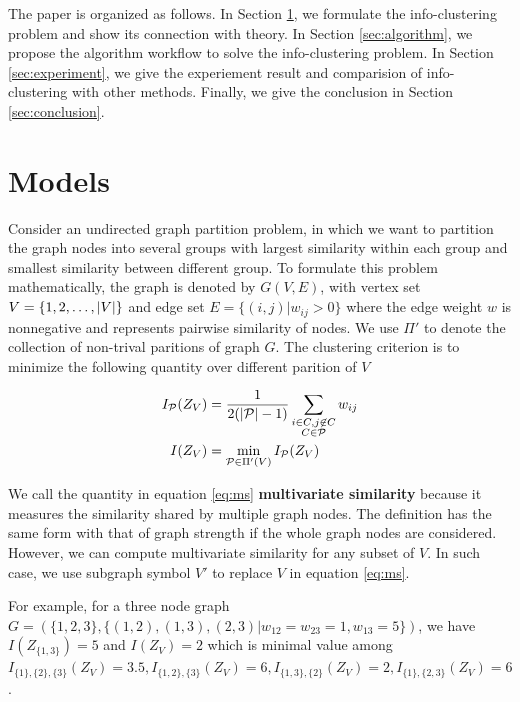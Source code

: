\documentclass{article}
\begin{document}
The paper is organized as follows. In Section \ref{sec:models}, we formulate the info-clustering problem and show its connection with theory. In Section \ref{sec:algorithm}, we propose the algorithm workflow to solve the info-clustering problem. In Section \ref{sec:experiment}, we give the experiement result and comparision of info-clustering with other methods. Finally, we give the conclusion in Section \ref{sec:conclusion}.


\section{Models}\label{sec:models}

Consider an undirected graph partition problem, in which we want to partition the graph nodes into several groups with largest similarity within each group and smallest similarity between different group. To formulate this problem mathematically, the graph is denoted by $G(V,E)$, with vertex set $V = \{1, 2, \dots, \lvert V\rvert\}$ and edge set $E=\{(i,j) | w_{ij}>0\}$ where the edge weight $w$ is nonnegative and represents pairwise similarity of nodes. We use $\Pi'$ to denote the collection of non-trival paritions of graph $G$. The clustering criterion is to minimize the following quantity over different parition of $V$
\begin{definition}\label{def:ms}
\begin{align}
I_{\mathcal{P}}(Z_V) & = {1 \over 2 ( \lvert\mathcal{P}\rvert - 1) } \sum_{\substack{i\in C, j \not\in C\\ C\in \mathcal{P}}} w_{ij} \\
I(Z_V) & = \min_{\mathcal{P} \in \Pi'(V)} I_{\mathcal{P}}(Z_V)  \label{eq:ms}
\end{align}
\end{definition}

We call the quantity in equation \eqref{eq:ms} \textbf{multivariate similarity} because it measures the similarity shared by multiple graph nodes. The definition has the same form with that of graph strength if  the whole graph nodes are considered\cite{RN12}. However, we can compute multivariate similarity for any subset of $V$. In such case, 
we use subgraph symbol $V'$ to replace $V$ in equation \eqref{eq:ms}.

For example, for a three node graph $G=(\{1,2,3\},\{(1,2),(1,3),(2,3)| w_{12}=w_{23}=1, w_{13}=5\})$, we have $I(Z_{\{1,3\}}) = 5$ and $I(Z_V) = 2$ which is minimal value among $I_{\{1\},\{2\},\{3\}}(Z_V)=3.5, I_{\{1, 2\},\{3\}}(Z_V)=6, I_{\{1,3\},\{2\}}(Z_V)=2, I_{\{1\},\{2,3\}}(Z_V)=6$.
\end{document}

